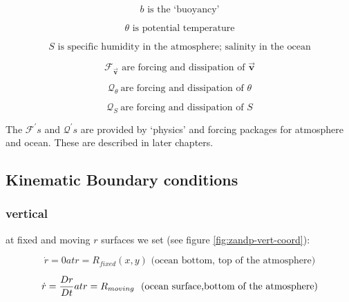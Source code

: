 \begin{equation*}
b\text{ is the `buoyancy'}
\end{equation*}

\begin{equation*}
\theta \text{ is potential temperature}
\end{equation*}

\begin{equation*}
S\text{ is specific humidity in the atmosphere; salinity in the ocean}
\end{equation*}

\begin{equation*}
\mathcal{F}_{\vec{\mathbf{v}}}\text{ are forcing and dissipation of }\vec{
\mathbf{v}}
\end{equation*}

\begin{equation*}
\mathcal{Q}_{\theta }\mathcal{\ }\text{are forcing and dissipation of }\theta
\end{equation*}

\begin{equation*}
\mathcal{Q}_{S}\mathcal{\ }\text{are forcing and dissipation of }S
\end{equation*}

The $\mathcal{F}^{\prime }s$ and $\mathcal{Q}^{\prime }s$ are provided by
`physics' and forcing packages for atmosphere and ocean. These are described
in later chapters.

\subsection{Kinematic Boundary conditions}

\subsubsection{vertical}

at fixed and moving $r$ surfaces we set (see figure \ref{fig:zandp-vert-coord}):

\begin{equation}
\dot{r}=0atr=R_{fixed}(x,y)\text{ (ocean bottom, top of the atmosphere)}
\label{eq:fixedbc}
\end{equation}

\begin{equation}
\dot{r}=\frac{Dr}{Dt}atr=R_{moving}\text{ \
(ocean surface,bottom of the atmosphere)}  \label{eq:movingbc}
\end{equation}

